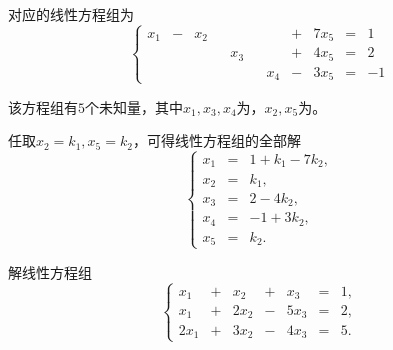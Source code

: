   \begin{frame}
  对应的线性方程组为
  $$
  \left\{
    \begin{array}{rcrcrcrcrcrr}
      x_1 & - &  x_2 &   &      &   &       & + & 7x_5 & = & 1 \\[0.1cm]
          &   &     &   &  x_3 &   &     & + & 4x_5 & = & 2 \\[0.1cm]
          &   &   &   &    &   &   x_4 & - & 3x_5 & = &-1
    \end{array}
  \right.
  $$ \pause 

  \begin{zhu}
    该方程组有$5$个未知量，其中$x_1,x_3,x_4$为，$x_2,x_5$为。
  \end{zhu}
  \pause 
  任取$x_2=k_1, x_5=k_2$，可得线性方程组的全部解
  $$
  \left\{
    \begin{array}{ccl}
      x_1 &=& 1+k_1-7k_2, \\[0.1cm]      
      x_2 &=& k_1, \\[0.1cm]
      x_3 &=& 2-4k_2, \\[0.1cm]
      x_4 &=& -1+3k_2,\\[0.1cm]
      x_5 &=& k_2.
    \end{array}
  \right.
  $$
\end{frame}

\begin{frame}

  \begin{li}
  解线性方程组
  $$
  \left\{
    \begin{array}{rcrcrcr}
      x_1 & + & x_2 & + &  x_3 & = & 1, \\[0.1cm]
      x_1 & + &2x_2 & - & 5x_3 & = & 2, \\[0.1cm]
      2x_1 & + &3x_2 & - & 4x_3 & = & 5.
    \end{array}
  \right.
  $$
\end{li}
\end{frame}

